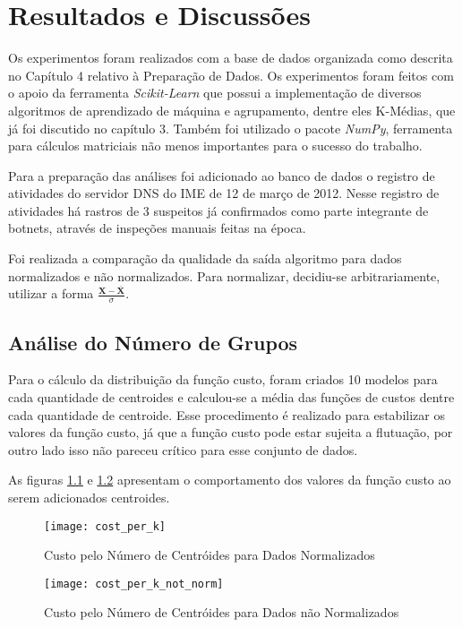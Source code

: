 \chapter{Resultados e Discussões}

Os experimentos foram realizados com a base de dados organizada como descrita no Capítulo 4 relativo à Preparação de Dados. Os experimentos foram feitos com o apoio da ferramenta \textit{Scikit-Learn} que possui a implementação de diversos algoritmos de aprendizado de máquina e agrupamento, dentre eles K-Médias, que já foi discutido no capítulo 3. Também foi utilizado o pacote \textit{NumPy}, ferramenta para cálculos matriciais não menos importantes para o sucesso do trabalho.

Para a preparação das análises foi adicionado ao banco de dados o registro de atividades do servidor DNS do IME de 12 de março de 2012. Nesse registro de atividades há rastros de 3 suspeitos já confirmados como parte integrante de botnets, através de inspeções manuais feitas na época.

Foi realizada a comparação da qualidade da saída algoritmo para dados normalizados e não normalizados. Para normalizar, decidiu-se arbitrariamente, utilizar a forma \(\frac{\mathbf{X} - \mathbf{\bar{X}}}{\sigma} \).

\section{Análise do Número de Grupos}

Para o cálculo da distribuição da função custo, foram criados 10 modelos para cada quantidade de centroides e calculou-se a média das funções de custos dentre cada quantidade de centroide. Esse procedimento é realizado para estabilizar os valores da função custo, já que a função custo pode estar sujeita a flutuação, por outro lado isso não pareceu crítico para esse conjunto de dados.

As figuras \ref{fig:cost_per_k} e \ref{fig:cost_per_k_not_norm} apresentam o comportamento dos valores da função custo ao serem adicionados centroides.

\begin{figure}[htbp]
\centering
\texttt{[image: cost\_per\_k]}
\caption[Custo pelo Número de Centróides para Dados Normalizados]{Custo pelo Número de Centróides para Dados Normalizados} \label{fig:cost_per_k}
\end{figure}

\begin{figure}[htbp]
\centering
\texttt{[image: cost\_per\_k\_not\_norm]}
\caption[Custo pelo Número de Centróides para Dados não Normalizados]{Custo pelo Número de Centróides para Dados não Normalizados} \label{fig:cost_per_k_not_norm}
\end{figure}

